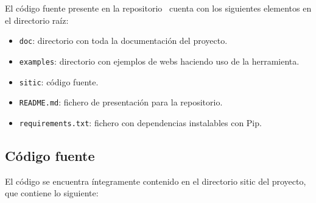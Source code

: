 El código fuente presente en la repositorio~\cite{repo} cuenta con los siguientes
elementos en el directorio raíz:

\begin{itemize}
    \item \texttt{doc}: directorio con toda la documentación del proyecto.
    \item \texttt{examples}: directorio con ejemplos de webs haciendo uso de la herramienta.
    \item \texttt{sitic}: código fuente.
    \item \texttt{README.md}: fichero de presentación para la repositorio.
    \item \texttt{requirements.txt}: fichero con dependencias instalables con Pip.
\end{itemize}

\subsection{Código fuente}

El código se encuentra íntegramente contenido en el directorio sitic del proyecto, que contiene lo siguiente:

